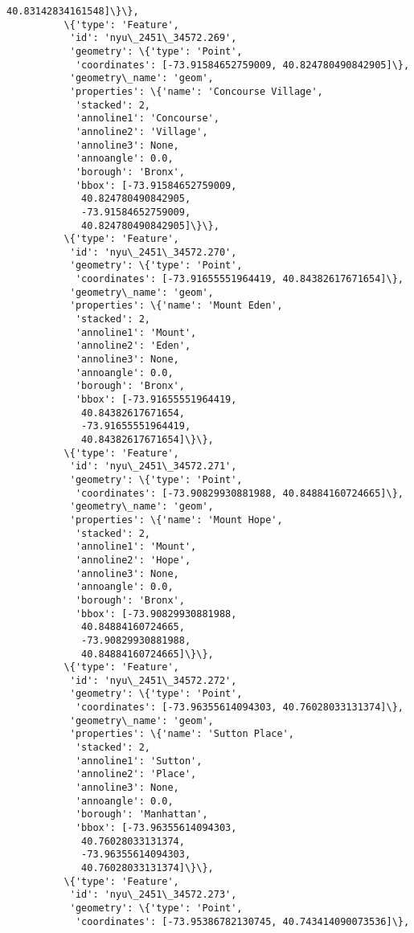 \documentclass[11pt]{article}
\begin{document}
\begin{Verbatim}[commandchars=\\\{\}]
             40.83142834161548]\}\},
          \{'type': 'Feature',
           'id': 'nyu\_2451\_34572.269',
           'geometry': \{'type': 'Point',
            'coordinates': [-73.91584652759009, 40.824780490842905]\},
           'geometry\_name': 'geom',
           'properties': \{'name': 'Concourse Village',
            'stacked': 2,
            'annoline1': 'Concourse',
            'annoline2': 'Village',
            'annoline3': None,
            'annoangle': 0.0,
            'borough': 'Bronx',
            'bbox': [-73.91584652759009,
             40.824780490842905,
             -73.91584652759009,
             40.824780490842905]\}\},
          \{'type': 'Feature',
           'id': 'nyu\_2451\_34572.270',
           'geometry': \{'type': 'Point',
            'coordinates': [-73.91655551964419, 40.84382617671654]\},
           'geometry\_name': 'geom',
           'properties': \{'name': 'Mount Eden',
            'stacked': 2,
            'annoline1': 'Mount',
            'annoline2': 'Eden',
            'annoline3': None,
            'annoangle': 0.0,
            'borough': 'Bronx',
            'bbox': [-73.91655551964419,
             40.84382617671654,
             -73.91655551964419,
             40.84382617671654]\}\},
          \{'type': 'Feature',
           'id': 'nyu\_2451\_34572.271',
           'geometry': \{'type': 'Point',
            'coordinates': [-73.90829930881988, 40.84884160724665]\},
           'geometry\_name': 'geom',
           'properties': \{'name': 'Mount Hope',
            'stacked': 2,
            'annoline1': 'Mount',
            'annoline2': 'Hope',
            'annoline3': None,
            'annoangle': 0.0,
            'borough': 'Bronx',
            'bbox': [-73.90829930881988,
             40.84884160724665,
             -73.90829930881988,
             40.84884160724665]\}\},
          \{'type': 'Feature',
           'id': 'nyu\_2451\_34572.272',
           'geometry': \{'type': 'Point',
            'coordinates': [-73.96355614094303, 40.76028033131374]\},
           'geometry\_name': 'geom',
           'properties': \{'name': 'Sutton Place',
            'stacked': 2,
            'annoline1': 'Sutton',
            'annoline2': 'Place',
            'annoline3': None,
            'annoangle': 0.0,
            'borough': 'Manhattan',
            'bbox': [-73.96355614094303,
             40.76028033131374,
             -73.96355614094303,
             40.76028033131374]\}\},
          \{'type': 'Feature',
           'id': 'nyu\_2451\_34572.273',
           'geometry': \{'type': 'Point',
            'coordinates': [-73.95386782130745, 40.743414090073536]\},

\end{Verbatim}
\end{document}
